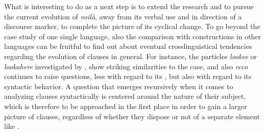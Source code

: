 \documentclass[output=paper,colorlinks,citecolor=brown]{langscibook}
\begin{document}
What is interesting to do as a next step is to extend the research and to pursue the current evolution of \emph{voilà}, away from its verbal use and in direction of a discourse marker, to complete the picture of its cyclical change. To go beyond the case study of one single language, also the comparison with  constructions in other languages can be fruitful to find out about eventual crosslinguistical tendencies regarding the evolution of  clauses in general. For instance, the  particles \emph{lookee} or \emph{lookahere} investigated by \citet{brinton2001}, show striking similarities to the  case, and also  \emph{ecco} continues to raise questions, less with regard to its , but also with regard to its syntactic behavior. A question that emerges recursively when it comes to analyzing  clauses syntactically is centered around the nature of their subject, which is therefore to be approached in the first place in order to gain a larger picture of  clauses, regardless of whether they dispose or not of a separate  element like .
 
 
%



{\sloppy\printbibliography[heading=subbibliography,notkeyword=this]}
\end{document}
